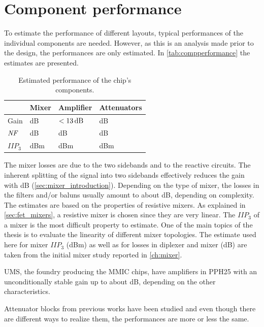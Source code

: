 	\section{Component performance}
		To estimate the performance of different layouts, typical performances of the individual components are needed. However, as this is an analysis made prior to the design, the performances are only estimated. In \autoref{tab:compperformance} the estimates are presented.

		\begin{table}[hbt!]
			\caption[Estimated performance of chip components.]{Estimated performance of the chip's components.}
			\label{tab:compperformance}
			\centering
			\begin{tabular}{ l l l l } \toprule
				& Mixer & Amplifier & Attenuators \\\midrule
				Gain & \unit[-8]{dB} & $\unit[<13]{dB}$ & \unit[-2--12]{dB} \\
				$\emph{NF}$ & \unit[8]{dB} & \unit[1--2]{dB} & \unit[2--12]{dB} \\
				$IIP_3$ & \unit[20--27]{dBm} & \unit[14--22]{dBm} & \unit[30]{dBm} \\\bottomrule
			\end{tabular}
		\end{table}

		The mixer losses are due to the two sidebands and to the reactive circuits. The inherent splitting of the signal into two sidebands effectively reduces the gain with \unit[3]{dB} (\autoref{sec:mixer_introduction}). Depending on the type of mixer, the losses in the filters and/or baluns usually amount to about \unit[3--7]{dB}, depending on complexity. The estimates are based on the properties of resistive mixers. As explained in \autoref{sec:fet_mixers}, a resistive mixer is chosen since they are very linear. The $IIP_3$ of a mixer is the most difficult property to estimate. One of the main topics of the thesis is to evaluate the linearity of different mixer topologies. The estimate used here for mixer $IIP_3$ (\unit[25]{dBm}) as well as for losses in diplexer and mixer (\unit[8]{dB}) are taken from the initial mixer study reported in \autoref{ch:mixer}.

		UMS, the foundry producing the MMIC chips, have amplifiers in PPH25 with an unconditionally stable gain up to about \unit[13]{dB}, depending on the other characteristics.\autocite{pph25manual}

		Attenuator blocks from previous works have been studied and even though there are different ways to realize them, the performances are more or less the same.\autocite{gustavsson07}


